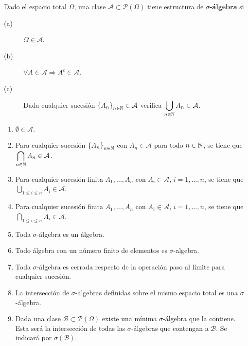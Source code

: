 \begin{definition}
Dado el espacio total $\displaystyle \Omega  $, una clase $\displaystyle \mathcal{A} \subset \mathcal{P}\left(\Omega \right) $ tiene estructura de $\displaystyle \sigma  $\textbf{-álgebra} si 
\begin{description}
\item[(a)] $\displaystyle \Omega \in \mathcal{A} $.
\item[(b)] $\displaystyle \forall A \in \mathcal{A} \Rightarrow A^{c} \in \mathcal{A} $.
\item[(c)] Dada cualquier sucesión $\displaystyle \left\{ A_{n}\right\} _{n\in\mathbb{N}} \in \mathcal{A} $ verifica $\displaystyle \bigcup_{n \in \mathbb{N}}A_{n}\in \mathcal{A} $.
\end{description}
\end{definition}
\begin{prop}
\begin{enumerate}
\item $\displaystyle \emptyset \in \mathcal{A} $.
\item Para cualquier sucesión $\displaystyle \left\{ A_{n}\right\} _{n\in\mathbb{N}} $ con $\displaystyle A_{n} \in \mathcal{A} $ para todo $\displaystyle n \in \mathbb{N} $, se tiene que $\displaystyle \bigcap_{n \in \mathbb{N}}A_{n} \in \mathcal{A} $.
\item Para cualquier sucesión finita $\displaystyle A_{1}, \ldots, A_{n} $ con $\displaystyle A_{i} \in \mathcal{A} $, $\displaystyle i = 1, \ldots, n $, se tiene que $\displaystyle \bigcup_{1\leq i \leq n}A_{i} \in \mathcal{A} $.
\item Para cualquier sucesión finita $\displaystyle A_{1}, \ldots, A_{n} $ con $\displaystyle A_{i} \in \mathcal{A} $, $\displaystyle i = 1, \ldots, n $, se tiene que $\displaystyle \bigcap_{1\leq i \leq n}A_{i} \in \mathcal{A} $.
\item Toda $\displaystyle \sigma  $-álgebra es un álgebra.
\item Todo álgebra con un número finito de elementos es $\displaystyle \sigma  $-algebra.
\item Toda $\displaystyle \sigma  $-álgebra es cerrada respecto de la operación paso al límite para cualquier sucesión.
\item La intersección de $\displaystyle \sigma  $-algebras definidas sobre el mismo espacio total es una $\displaystyle \sigma  $-álgebra.
\item Dada una clase $\displaystyle \mathcal{B} \subset \mathcal{P}\left(\Omega\right)$ existe una mínima $\displaystyle \sigma  $-álgebra que la contiene. Esta será la intersección de todas las $\displaystyle \sigma  $-álgebras que contengan a $\displaystyle \mathcal{B} $. Se indicará por $\displaystyle \sigma\left(\mathcal{B}\right) $.
\end{enumerate}
\end{prop}

